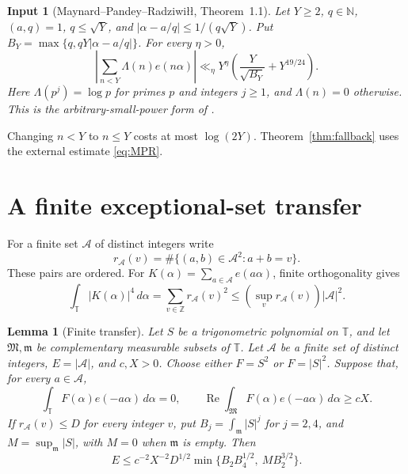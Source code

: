 \documentclass[11pt]{article}
\newtheorem{lemma}[theorem]{Lemma}
\newtheorem{inputthm}[theorem]{Input}
\theoremstyle{definition}
\theoremstyle{remark}
\numberwithin{equation}{section}
\newcommand{\Z}{\mathbb Z}
\newcommand{\N}{\mathbb N}
\newcommand{\T}{\mathbb T}
\newcommand{\M}{\mathfrak M}
\newcommand{\m}{\mathfrak m}
\newcommand{\A}{\mathcal A}
\newcommand{\abs}[1]{\left\lvert#1\right\rvert}
\DeclareMathOperator{\Rea}{Re}
\begin{document}
\begin{inputthm}[Maynard--Pandey--Radziwi\l\l, Theorem~1.1]\label{input:MPR}
Let $Y\ge2$, $q\in\N$, $(a,q)=1$, $q\le\sqrt Y$, and
$|\alpha-a/q|\le1/(q\sqrt Y)$. Put
$B_Y=\max\{q,qY|\alpha-a/q|\}$. For every $\eta>0$,
\begin{equation}\label{eq:MPR}
 \abs{\sum_{n<Y}\Lambda(n)e(n\alpha)}
       \ll_\eta Y^\eta\left(\frac{Y}{\sqrt{B_Y}}+Y^{19/24}\right).
\end{equation}
Here $\Lambda(p^j)=\log p$ for primes $p$ and integers $j\ge1$,
and $\Lambda(n)=0$ otherwise. This is the arbitrary-small-power
form of \cite[Theorem~1.1]{MPR}.
\end{inputthm}

Changing $n<Y$ to $n\le Y$ costs at most $\log(2Y)$.
Theorem~\ref{thm:fallback} uses the external estimate \eqref{eq:MPR}.

\section{A finite exceptional-set transfer}\label{sec:transfer}

For a finite set $\A$ of distinct integers write
\begin{equation}\label{eq:multiplicity}
 r_\A(v)=\#\{(a,b)\in\A^2:a+b=v\}.
\end{equation}
These pairs are ordered. For $K(\alpha)=\sum_{a\in\A}e(a\alpha)$,
finite orthogonality gives
\begin{equation}\label{eq:energy}
 \int_\T|K(\alpha)|^4\,d\alpha
       =\sum_{v\in\Z}r_\A(v)^2
       \le \left(\sup_v r_\A(v)\right)|\A|^2.
\end{equation}

\begin{lemma}[Finite transfer]\label{lem:transfer}
Let $S$ be a trigonometric polynomial on $\T$, and let $\M,\m$ be
complementary measurable subsets of $\T$. Let $\A$ be a finite set
of distinct integers, $E=|\A|$, and $c,X>0$. Choose either
$F=S^2$ or $F=|S|^2$. Suppose that, for every $a\in\A$,
\begin{equation}\label{eq:Fourierconditions}
 \int_\T F(\alpha)e(-a\alpha)\,d\alpha=0,\qquad
 \Rea\int_\M F(\alpha)e(-a\alpha)\,d\alpha\ge cX.
\end{equation}
If $r_\A(v)\le D$ for every integer $v$, put
$B_j=\int_\m|S|^j$ for $j=2,4$, and $M=\sup_\m|S|$, with
$M=0$ when $\m$ is empty. Then
\begin{equation}\label{eq:transfer}
 E\le c^{-2}X^{-2}D^{1/2}
              \min\{B_2B_4^{1/2},\ M B_2^{3/2}\}.
\end{equation}
\end{lemma}
\end{document}

